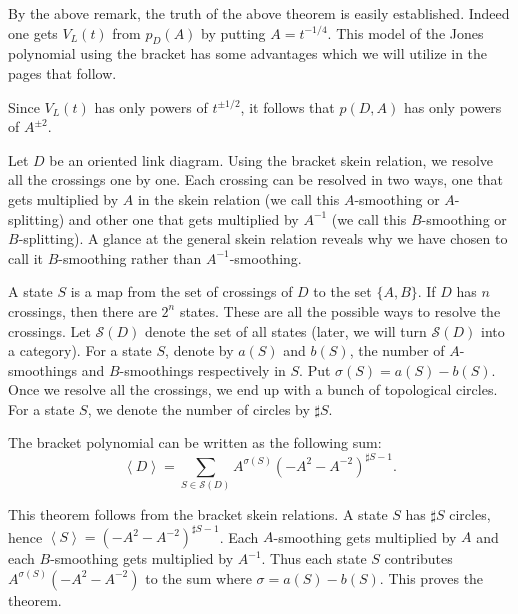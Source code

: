 By the above remark, the truth of the above theorem is easily established. Indeed one gets $V_L(t)$ from $p_D(A)$ by putting $A = t^{-1/4}$. This model of the Jones polynomial using the bracket has some advantages which we will utilize in the pages that follow. 

\begin{remark}
\label{cha:jones-polynomial-6}
  Since $V_L(t)$ has only powers of $t^{\pm 1/2}$, it follows that $p(D,A)$ has only powers of $A^{\pm 2}$.
\end{remark}

Let $D$ be an oriented link diagram. Using the bracket skein relation, we resolve all the crossings one by one. Each crossing can be resolved in two ways, one that gets multiplied by $A$ in the skein relation (we call this $A$-smoothing or $A$-splitting) and other one that gets multiplied by $A^{-1}$ (we call this $B$-smoothing or $B$-splitting). A glance at the general skein relation reveals why we have chosen to call it $B$-smoothing rather than $A^{-1}$-smoothing.

A state $S$ is a map from the set of crossings of $D$ to the set $\{A, B\}$. If $D$ has $n$ crossings, then there are $2^n$ states. These are all the possible ways to resolve the crossings. Let $\mathcal{S}(D)$ denote the set of all states (later, we will turn $\mathcal{S}(D)$ into a category). For a state $S$, denote by $a(S)$ and $b(S)$, the number of $A$-smoothings and $B$-smoothings respectively in $S$. Put $\sigma(S) = a(S) - b(S)$. Once we resolve all the crossings, we end up with a bunch of topological circles. For a state $S$, we denote the number of circles by $\sharp S$.

\begin{theorem}
\label{cha:jones-polynomial-7}
  The bracket polynomial can be written as the following sum: 
\begin{equation}
\label{2:eq:2}
\left< D \right> = \sum_{S\in\mathcal{S}(D)}^{}  A^{\sigma(S)}(-A^2 - A^{-2})^{\sharp S - 1}.
\end{equation}
\end{theorem}

This theorem follows from the bracket skein relations. A state $S$ has $\sharp S$ circles, hence $\left< S \right> = (-A^2 - A^{-2})^{\sharp S - 1}$. Each $A$-smoothing gets multiplied by $A$ and each $B$-smoothing gets multiplied by $A^{-1}$. Thus each state $S$ contributes $A^{\sigma(S)}(-A^2 - A^{-2})$ to the sum where $\sigma = a(S) - b(S)$. This proves the theorem.


